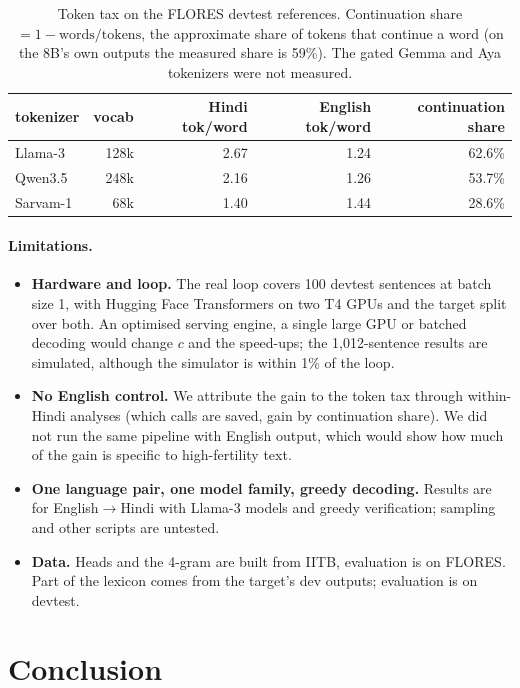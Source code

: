 \documentclass[11pt]{article}
\begin{document}
\begin{table}[t]
\centering
\begin{tabular}{lrrrr}
\toprule
tokenizer & vocab & Hindi tok/word & English tok/word & continuation share \\
\midrule
Llama-3 & 128k & 2.67 & 1.24 & 62.6\% \\
Qwen3.5 & 248k & 2.16 & 1.26 & 53.7\% \\
Sarvam-1 & 68k & 1.40 & 1.44 & 28.6\% \\
\bottomrule
\end{tabular}
\caption{Token tax on the FLORES devtest references. Continuation share $= 1 - \text{words}/\text{tokens}$,
the approximate share of tokens that continue a word (on the 8B's own outputs the measured share is 59\%).
The gated Gemma and Aya tokenizers were not measured.}
\label{tab:tax}
\end{table}

\paragraph{Limitations.}
\begin{itemize}
  \item \textbf{Hardware and loop.} The real loop covers 100 devtest sentences at batch size 1, with
  Hugging Face Transformers on two T4 GPUs and the target split over both. An optimised serving engine,
  a single large GPU or batched decoding would change $c$ and the speed-ups; the 1,012-sentence results
  are simulated, although the simulator is within 1\% of the loop.
  \item \textbf{No English control.} We attribute the gain to the token tax through within-Hindi
  analyses (which calls are saved, gain by continuation share). We did not run the same pipeline with
  English output, which would show how much of the gain is specific to high-fertility text.
  \item \textbf{One language pair, one model family, greedy decoding.} Results are for
  English$\to$Hindi with Llama-3 models and greedy verification; sampling and other scripts are untested.
  \item \textbf{Data.} Heads and the 4-gram are built from IITB, evaluation is on FLORES. Part of the
  lexicon comes from the target's dev outputs; evaluation is on devtest.
\end{itemize}

\section{Conclusion}
\end{document}
